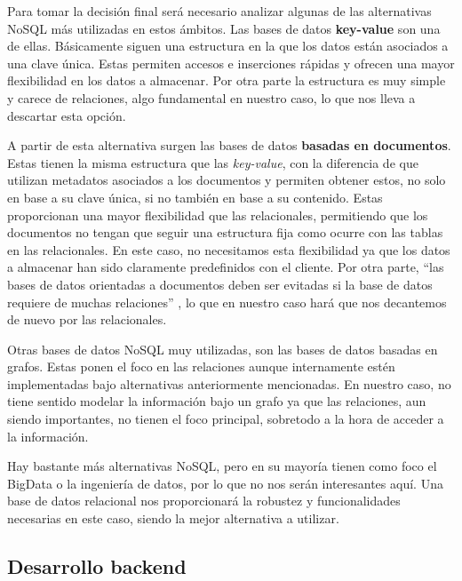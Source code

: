 Para tomar la decisión final será necesario analizar algunas de las alternativas NoSQL más utilizadas en estos ámbitos. Las bases de datos \textbf{key-value} son una de ellas. Básicamente siguen una estructura en la que los datos están asociados a una clave única. Estas permiten accesos e inserciones rápidas y ofrecen una mayor flexibilidad en los datos a almacenar. Por otra parte la estructura es muy simple y carece de relaciones, algo fundamental en nuestro caso, lo que nos lleva a descartar esta opción.

A partir de esta alternativa surgen las bases de datos \textbf{basadas en documentos}. Estas tienen la misma estructura que las \textit{key-value}, con la diferencia de que utilizan metadatos asociados a los documentos y permiten obtener estos, no solo en base a su clave única, si no también en base a su contenido. Estas proporcionan una mayor flexibilidad que las relacionales, permitiendo que los documentos no tengan que seguir una estructura fija como ocurre con las tablas en las relacionales. En este caso, no necesitamos esta flexibilidad ya que los datos a almacenar han sido claramente predefinidos con el cliente. Por otra parte, ``las bases de datos orientadas a documentos deben ser evitadas si la base de datos requiere de muchas relaciones'' \cite{NoSQLvsSQL_2}, lo que en nuestro caso hará que nos decantemos de nuevo por las relacionales.

Otras bases de datos NoSQL muy utilizadas, son las bases de datos basadas en grafos. Estas ponen el foco en las relaciones aunque internamente estén implementadas bajo alternativas anteriormente mencionadas. En nuestro caso, no tiene sentido modelar la información bajo un grafo ya que las relaciones, aun siendo importantes, no tienen el foco principal, sobretodo a la hora de acceder a la información.

Hay bastante más alternativas NoSQL, pero en su mayoría tienen como foco el BigData o la ingeniería de datos, por lo que no nos serán interesantes aquí. Una base de datos relacional nos proporcionará la robustez y funcionalidades necesarias en este caso, siendo la mejor alternativa a utilizar.

\subsection{Desarrollo backend}

